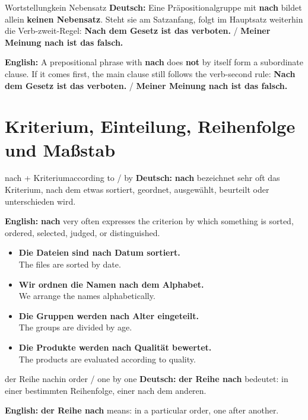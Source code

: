 \documentclass[a4paper,11pt]{article}
\newcommand{\GermanText}[1]{\textbf{Deutsch: }#1\par}
\newcommand{\EnglishText}[1]{{\small\color{SoftGray}\textbf{English: }#1\par}}
\newcommand{\ExampleItem}[2]{\item \textbf{#1}\\{\small\color{SoftGray}#2}}
\begin{document}
        \begin{grammarentry}{Wortstellung}{kein Nebensatz}
            \GermanText{Eine Präpositionalgruppe mit \textbf{nach} bildet allein \textbf{keinen Nebensatz}. Steht sie am Satzanfang, folgt im Hauptsatz weiterhin die Verb-zweit-Regel: \textbf{Nach dem Gesetz ist das verboten.} / \textbf{Meiner Meinung nach ist das falsch.}}
            \EnglishText{A prepositional phrase with \textbf{nach} does \textbf{not} by itself form a subordinate clause. If it comes first, the main clause still follows the verb-second rule: \textbf{Nach dem Gesetz ist das verboten.} / \textbf{Meiner Meinung nach ist das falsch.}}
        \end{grammarentry}


    \section{Kriterium, Einteilung, Reihenfolge und Maßstab}

        \begin{grammarentry}{nach + Kriterium}{according to / by}
            \GermanText{\textbf{nach} bezeichnet sehr oft das Kriterium, nach dem etwas sortiert, geordnet, ausgewählt, beurteilt oder unterschieden wird.}
            \EnglishText{\textbf{nach} very often expresses the criterion by which something is sorted, ordered, selected, judged, or distinguished.}
        \end{grammarentry}

        \begin{exbox}
            \begin{itemize}
                \ExampleItem{Die Dateien sind nach Datum sortiert.}{The files are sorted by date.}
                \ExampleItem{Wir ordnen die Namen nach dem Alphabet.}{We arrange the names alphabetically.}
                \ExampleItem{Die Gruppen werden nach Alter eingeteilt.}{The groups are divided by age.}
                \ExampleItem{Die Produkte werden nach Qualität bewertet.}{The products are evaluated according to quality.}
            \end{itemize}
        \end{exbox}

        \begin{grammarentry}{der Reihe nach}{in order / one by one}
            \GermanText{\textbf{der Reihe nach} bedeutet: in einer bestimmten Reihenfolge, einer nach dem anderen.}
            \EnglishText{\textbf{der Reihe nach} means: in a particular order, one after another.}
        \end{grammarentry}
\end{document}
